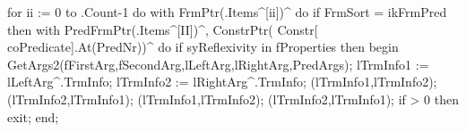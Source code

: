    for ii := 0 to .Count-1 do
      with FrmPtr(.Items^[ii])^ do
         if FrmSort = ikFrmPred then
            with PredFrmPtr(.Items^[II])^,
   ConstrPtr( Constr[ coPredicate].At(PredNr))^ do
      if syReflexivity in fProperties then
      begin
         GetArgs2(fFirstArg,fSecondArg,lLeftArg,lRightArg,PredArgs);
         lTrmInfo1 := lLeftArg^.TrmInfo;
         lTrmInfo2 := lRightArg^.TrmInfo;
         (lTrmInfo1,lTrmInfo2);
         (lTrmInfo2,lTrmInfo1);
         (lTrmInfo1,lTrmInfo2);
         (lTrmInfo2,lTrmInfo1);
         if  > 0 then exit;
      end;
   
